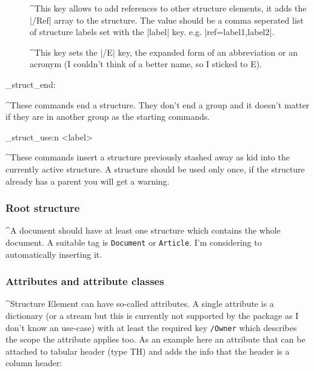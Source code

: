 \documentclass[DIV=12,parskip=half-,bibliography=totoc]{scrartcl}
\begin{document}
\begin{description}
   \item[]
     \TagP^This key allows to add references to other structure elements, it adds the |/Ref| array to the structure.
       The value should be a comma seperated list of structure labels set with the |label| key.
     e.g. |ref={label1,label2}|.\Pmeti

   \item[]
     \TagP^This key sets the |/E| key, the expanded form of an abbreviation or an acronym (I couldn't think of a better name, so I sticked to E).\Pmeti
\end{description}


\ExplSyntaxOn
\DescribeMacro\tagstructend
\DescribeMacro\tag_struct_end:
\ExplSyntaxOff

\TagP^These commands end a structure. They don't end a group and it doesn't matter if they are in another group as the starting commands.\TagPend

\ExplSyntaxOn
\DescribeMacro{}
\DescribeMacro\tag_struct_use:n {<label>}
\ExplSyntaxOff

\TagP^These commands insert a structure previously stashed away as kid into the currently active structure. A structure should be used only once, if the structure already has a parent you will get a warning.\TagPend

\subsubsection{Root structure}

\TagP^A document should have at least one structure which contains the whole document. A suitable tag is \texttt{Document} or \texttt{Article}. I'm considering to automatically inserting it.\TagPend

\subsubsection{Attributes and attribute classes}\label{sec:attributes}

\TagP^Structure Element can have so-called attributes. A single attribute is a dictionary%
(or a stream but this is currently not supported by the package as I don't know an use-case)
with at least the required key \verb+/Owner+ which describes the scope the attribute applies too.
As an example here an attribute that can be attached to tabular header (type TH) and adds the info that the header is a column header:\TagPend
\end{document}
